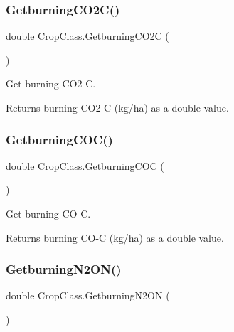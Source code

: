 \subsubsection{\texorpdfstring{GetburningCO2C()}{GetburningCO2C()}}
{\footnotesize\ttfamily double Crop\+Class.\+Getburning\+C\+O2C (\begin{DoxyParamCaption}{ }\end{DoxyParamCaption})\hspace{0.3cm}{\ttfamily [inline]}}



Get burning C\+O2-\/C. 

\begin{DoxyReturn}{Returns}
burning C\+O2-\/C (kg/ha) as a double value. 
\end{DoxyReturn}
\mbox{\label{class_crop_class_a2b2effa3b4257e0f29d2ca7601c0bae2}} 
\subsubsection{\texorpdfstring{GetburningCOC()}{GetburningCOC()}}
{\footnotesize\ttfamily double Crop\+Class.\+Getburning\+C\+OC (\begin{DoxyParamCaption}{ }\end{DoxyParamCaption})\hspace{0.3cm}{\ttfamily [inline]}}



Get burning C\+O-\/C. 

\begin{DoxyReturn}{Returns}
burning C\+O-\/C (kg/ha) as a double value. 
\end{DoxyReturn}
\mbox{\label{class_crop_class_a7ff60b7ab1e8c511aea2f2dafea64a3b}} 
\subsubsection{\texorpdfstring{GetburningN2ON()}{GetburningN2ON()}}
{\footnotesize\ttfamily double Crop\+Class.\+Getburning\+N2\+ON (\begin{DoxyParamCaption}{ }\end{DoxyParamCaption})\hspace{0.3cm}{\ttfamily [inline]}}



